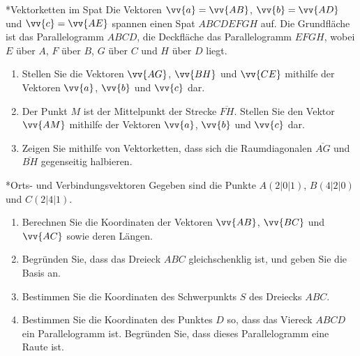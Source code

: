 

\begin{uebung}*{Vektorketten im Spat}
Die Vektoren $\vv{a}=\vv{AB}$, $\vv{b}=\vv{AD}$ und $\vv{c}=\vv{AE}$ spannen einen Spat $ABCDEFGH$ auf. Die Grundfläche ist das Parallelogramm $ABCD$, die Deckfläche das Parallelogramm $EFGH$, wobei $E$ über $A$, $F$ über $B$, $G$ über $C$ und $H$ über $D$ liegt.
\begin{enumerate}[label=\alph*)]
  \item Stellen Sie die Vektoren $\vv{AG}$, $\vv{BH}$ und $\vv{CE}$ mithilfe der Vektoren $\vv{a}$, $\vv{b}$ und $\vv{c}$ dar.
  \item Der Punkt $M$ ist der Mittelpunkt der Strecke $\overline{FH}$. Stellen Sie den Vektor $\vv{AM}$ mithilfe der Vektoren $\vv{a}$, $\vv{b}$ und $\vv{c}$ dar.
  \item Zeigen Sie mithilfe von Vektorketten, dass sich die Raumdiagonalen $\overline{AG}$ und $\overline{BH}$ gegenseitig halbieren.
\end{enumerate}
\end{uebung}

\begin{uebung}*{Orts- und Verbindungsvektoren}
Gegeben sind die Punkte $A(2|0|1)$, $B(4|2|0)$ und $C(2|4|1)$.
\begin{enumerate}[label=\alph*)]
  \item Berechnen Sie die Koordinaten der Vektoren $\vv{AB}$, $\vv{BC}$ und $\vv{AC}$ sowie deren Längen.
  \item Begründen Sie, dass das Dreieck $ABC$ gleichschenklig ist, und geben Sie die Basis an.
  \item Bestimmen Sie die Koordinaten des Schwerpunkts $S$ des Dreiecks $ABC$.
  \item Bestimmen Sie die Koordinaten des Punktes $D$ so, dass das Viereck $ABCD$ ein Parallelogramm ist. Begründen Sie, dass dieses Parallelogramm eine Raute ist.
\end{enumerate}
\end{uebung}



